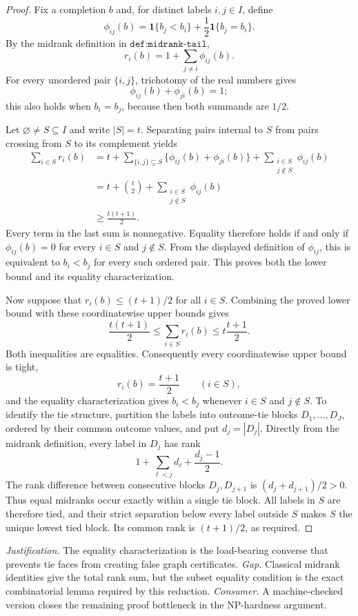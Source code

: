\documentclass{article}
\begin{document}
\begin{proof}
Fix a completion \(b\) and, for distinct labels \(i,j\in I\), define
\[
 \phi_{ij}(b)
 =\mathbf 1\{b_j<b_i\}+\frac12\mathbf 1\{b_j=b_i\}.
\]
By the midrank definition in \(\texttt{def:midrank-tail}\),
\[
 r_i(b)=1+\sum_{j\ne i}\phi_{ij}(b).
\]
For every unordered pair \(\{i,j\}\), trichotomy of the real numbers gives
\[
 \phi_{ij}(b)+\phi_{ji}(b)=1;
\]
this also holds when \(b_i=b_j\), because then both summands are \(1/2\).

Let \(\varnothing\ne S\subseteq I\) and write \(|S|=t\).  Separating pairs internal to \(S\) from pairs crossing from \(S\) to its complement yields
\[
\begin{aligned}
 \sum_{i\in S}r_i(b)
 &=t+
   \sum_{\{i,j\}\subseteq S}\bigl\{\phi_{ij}(b)+\phi_{ji}(b)\bigr\}
   +\sum_{\substack{i\in S\\j\notin S}}\phi_{ij}(b)\\
 &=t+\binom{t}{2}
   +\sum_{\substack{i\in S\\j\notin S}}\phi_{ij}(b)\\
 &\ge \frac{t(t+1)}2.
\end{aligned}
\]
Every term in the last sum is nonnegative.  Equality therefore holds if and only if
\(\phi_{ij}(b)=0\) for every \(i\in S\) and \(j\notin S\).  From the displayed definition of \(\phi_{ij}\), this is equivalent to \(b_i<b_j\) for every such ordered pair.  This proves both the lower bound and its equality characterization.

Now suppose that \(r_i(b)\le (t+1)/2\) for all \(i\in S\).  Combining the proved lower bound with these coordinatewise upper bounds gives
\[
 \frac{t(t+1)}2
 \le \sum_{i\in S}r_i(b)
 \le t\frac{t+1}{2}.
\]
Both inequalities are equalities.  Consequently every coordinatewise upper bound is tight,
\[
 r_i(b)=\frac{t+1}{2}\qquad(i\in S),
\]
and the equality characterization gives \(b_i<b_j\) whenever \(i\in S\) and \(j\notin S\).
To identify the tie structure, partition the labels into outcome-tie blocks \(D_1,\ldots,D_J\), ordered by their common outcome values, and put \(d_j=|D_j|\).  Directly from the midrank definition, every label in \(D_j\) has rank
\[
 1+\sum_{\ell<j}d_\ell+\frac{d_j-1}{2}.
\]
The rank difference between consecutive blocks \(D_j,D_{j+1}\) is \((d_j+d_{j+1})/2>0\).  Thus equal midranks occur exactly within a single tie block.  All labels in \(S\) are therefore tied, and their strict separation below every label outside \(S\) makes \(S\) the unique lowest tied block.  Its common rank is \((t+1)/2\), as required.
\end{proof}
\par\smallskip\noindent \textit{Justification.} The equality characterization is the load-bearing converse that prevents tie faces from creating false graph certificates. \textit{Gap.} Classical midrank identities give the total rank sum, but the subset equality condition is the exact combinatorial lemma required by this reduction. \textit{Consumer.} A machine-checked version closes the remaining proof bottleneck in the NP-hardness argument.
\end{document}
